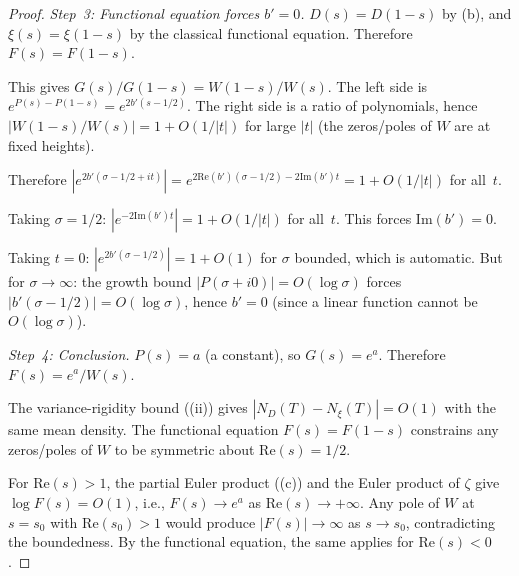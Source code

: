 \documentclass[11pt,a4paper]{article}
\theoremstyle{plain}
\theoremstyle{remark}
\begin{document}
\begin{proof}
\emph{Step~3: Functional equation forces $b'=0$.}
$D(s)=D(1-s)$ by (b), and $\xi(s)=\xi(1-s)$
by the classical functional equation.  Therefore $F(s)=F(1-s)$.

This gives $G(s)/G(1-s)=W(1-s)/W(s)$.  The left side is
$e^{P(s)-P(1-s)}=e^{2b'(s-1/2)}$.  The right side is a ratio of
polynomials, hence $|W(1-s)/W(s)|=1+O(1/|t|)$ for large $|t|$
(the zeros/poles of $W$ are at fixed heights).

Therefore $|e^{2b'(\sigma-1/2+it)}|=e^{2\mathrm{Re}(b')(\sigma-1/2)
-2\mathrm{Im}(b')t}=1+O(1/|t|)$ for all~$t$.

Taking $\sigma=1/2$: $|e^{-2\mathrm{Im}(b')t}|=1+O(1/|t|)$ for all~$t$.
This forces $\mathrm{Im}(b')=0$.

Taking $t=0$: $|e^{2b'(\sigma-1/2)}|=1+O(1)$ for $\sigma$ bounded,
which is automatic.  But for $\sigma\to\infty$: the growth bound
$|P(\sigma+i0)|=O(\log\sigma)$ forces $|b'(\sigma-1/2)|=O(\log\sigma)$,
hence $b'=0$ (since a linear function cannot be $O(\log\sigma)$).

%

\emph{Step~4: Conclusion.}
$P(s)=a$ (a constant), so $G(s)=e^a$.  Therefore
$F(s)=e^a/W(s)$.

The variance-rigidity bound ((ii)) gives
$|N_D(T)-N_\xi(T)|=O(1)$ with the same mean density.  The functional
equation $F(s)=F(1-s)$ constrains any zeros/poles of $W$ to be
symmetric about $\mathrm{Re}(s)=1/2$.

For $\mathrm{Re}(s)>1$, the partial Euler product ((c))
and the Euler product of $\zeta$ give $\log F(s)=O(1)$, i.e.,
$F(s)\to e^a$ as $\mathrm{Re}(s)\to+\infty$.  Any pole of $W$ at
$s=s_0$ with $\mathrm{Re}(s_0)>1$ would produce $|F(s)|\to\infty$
as $s\to s_0$, contradicting the boundedness.  By the functional
equation, the same applies for $\mathrm{Re}(s)<0$.


\end{proof}
\end{document}
